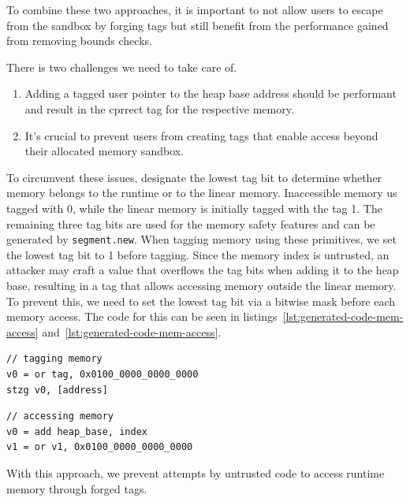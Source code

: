 To combine these two approaches, it is important to not allow users to escape from the sandbox by forging tags but still benefit from the
performance gained from removing bounds checks.

There is two challenges we need to take care of.
\begin{enumerate}
    \item Adding a tagged user pointer to the heap base address should be performant and result in the cprrect tag for the respective memory.
    \item It's crucial to prevent users from creating tags that enable access beyond their allocated memory sandbox.
\end{enumerate}

To circumvent these issues, designate the lowest tag bit to determine whether memory belongs to the runtime or to the linear memory.
Inaccessible memory us tagged with 0, while the linear memory is initially tagged with the tag 1.
The remaining three tag bits are used for the memory safety features and can be generated by \texttt{segment.new}.
When tagging memory using these primitives, we set the lowest tag bit to 1 before tagging.
Since the memory index is untrusted, an attacker may craft a value that overflows the tag bits when adding it to the heap base, resulting in a tag that allows accessing memory outside the linear memory.
To prevent this, we need to set the lowest tag bit via a bitwise mask before each memory access.
The code for this can be seen in listings~\ref{lst:generated-code-mem-access} and~\ref{lst:generated-code-mem-access}.

\begin{lstlisting}[frame=h,style=customc,
    label={lst:generated-code-tagging}]
// tagging memory
v0 = or tag, 0x0100_0000_0000_0000
stzg v0, [address]
\end{lstlisting}

\begin{lstlisting}[frame=h,style=customc,
    label={lst:generated-code-mem-access}]
// accessing memory
v0 = add heap_base, index
v1 = or v1, 0x0100_0000_0000_0000
\end{lstlisting}

With this approach, we prevent attempts by untrusted code to access runtime memory through forged tags.

